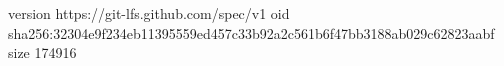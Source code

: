 version https://git-lfs.github.com/spec/v1
oid sha256:32304e9f234eb11395559ed457c33b92a2c561b6f47bb3188ab029c62823aabf
size 174916
